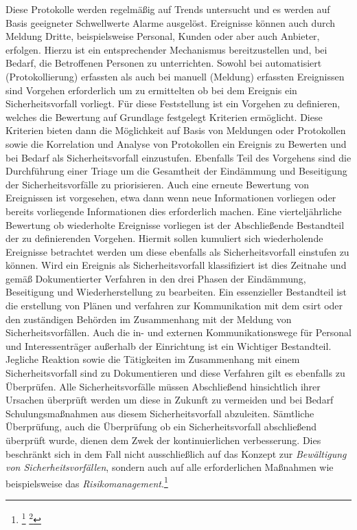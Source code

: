 \documentclass[11pt,a4paper,hidelinks]{article}   %
\begin{document}
                Diese Protokolle werden regelmäßig auf Trends untersucht und es werden auf Basis geeigneter Schwellwerte Alarme ausgelöst. Ereignisse können auch durch Meldung Dritte, beispielsweise Personal, Kunden oder aber auch Anbieter, erfolgen. Hierzu ist ein entsprechender Mechanismus bereitzustellen und, bei Bedarf, die Betroffenen Personen zu unterrichten. Sowohl bei automatisiert (Protokollierung) erfassten als auch bei manuell (Meldung) erfassten Ereignissen sind Vorgehen erforderlich um zu ermittelten ob bei dem Ereignis ein Sicherheitsvorfall vorliegt. Für diese Feststellung ist ein Vorgehen zu definieren, welches die Bewertung auf Grundlage festgelegt Kriterien ermöglicht. Diese Kriterien bieten dann die Möglichkeit auf Basis von Meldungen oder Protokollen sowie die Korrelation und Analyse von Protokollen ein Ereignis zu Bewerten und bei Bedarf als Sicherheitsvorfall einzustufen. Ebenfalls Teil des Vorgehens sind die Durchführung einer Triage um die Gesamtheit der Eindämmung und Beseitigung der Sicherheitsvorfälle zu priorisieren. Auch eine erneute Bewertung von Ereignissen ist vorgesehen, etwa dann wenn neue Informationen vorliegen oder bereits vorliegende Informationen dies erforderlich machen. Eine vierteljährliche Bewertung ob wiederholte Ereignisse vorliegen ist der Abschließende Bestandteil der zu definierenden Vorgehen. Hiermit sollen kumuliert sich wiederholende Ereignisse betrachtet werden um diese ebenfalls als Sicherheitsvorfall einstufen zu können. Wird ein Ereignis als Sicherheitsvorfall klassifiziert ist dies Zeitnahe und gemäß Dokumentierter Verfahren in den drei Phasen der Eindämmung, Beseitigung und Wiederherstellung zu bearbeiten. Ein essenzieller Bestandteil ist die erstellung von Plänen und verfahren zur Kommunikation mit dem \gls{csirt} oder den zuständigen Behörden im Zusammenhang mit der Meldung von Sicherheitsvorfällen. Auch die in- und externen Kommunikationswege für Personal und Interessenträger außerhalb der Einrichtung ist ein Wichtiger Bestandteil. Jegliche Reaktion sowie die Tätigkeiten im Zusammenhang mit einem Sicherheitsvorfall sind zu Dokumentieren und diese Verfahren gilt es ebenfalls zu Überprüfen. Alle Sicherheitsvorfälle müssen Abschließend hinsichtlich ihrer Ursachen überprüft werden um diese in Zukunft zu vermeiden und bei Bedarf Schulungsmaßnahmen aus diesem Sicherheitsvorfall abzuleiten. Sämtliche Überprüfung, auch die Überprüfung ob ein Sicherheitsvorfall abschließend überprüft wurde, dienen dem Zwek der kontinuierlichen verbesserung. Dies beschränkt sich in dem Fall nicht ausschließlich auf das Konzept zur \emph{Bewältigung von Sicherheitsvorfällen}, sondern auch auf alle erforderlichen Maßnahmen wie beispielsweise das \emph{Risikomanagement}.\footnote{
                    \footcite[Vgl. Anhang, Nummer 3.2.4 \&1 3.3 - 3.6.2][]{EU2024-2690}
                    \footcite[Vgl. Artikel 4][]{EU2024-2690}
                }\medbreak
\end{document}
